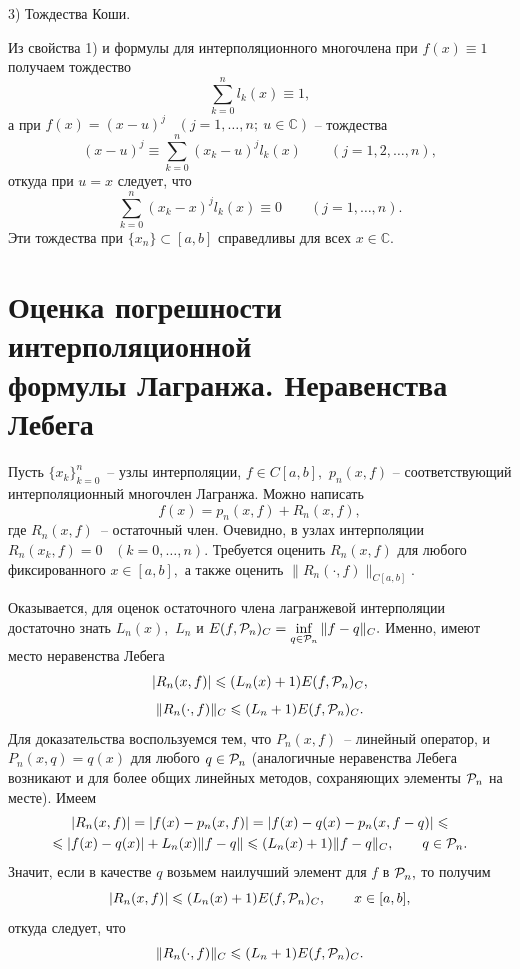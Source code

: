 3) Тождества Коши.

Из свойства 1) и формулы для интерполяционного многочлена {при $f(x)\equiv 1$}
получаем {тождество}
\[ \sum\limits_{k=0}^n l_k(x) \equiv 1, \]
{а при} $f(x)=(x-u)^j$~ $(j=1,\dots ,n;\ u\in \mathbb C)$ {-- тождества}
$$
(x-u)^j\equiv \sum\limits_{k=0}^n (x_k-u)^j l_k(x) \qquad (j=1,2,\ldots,n),
$$
{откуда при} $u=x$ следует, {что}
\begin{equation}\label{f1-1}
\sum\limits_{k=0}^n (x_k-x)^j l_k(x)\equiv 0\qquad (j=1,\ldots ,n).
\end{equation}
Эти тождества при $\{x_n\}\subset [a,b]$ справедливы для
всех $x\in \mathbb C.$

\section{Оценка погрешности интерполяционной \\ формулы
Лагранжа. Неравенства Лебега}

Пусть $\{x_k\}_{k=0}^n$~-- узлы интерполяции, $f \in C[a,b],$ $p_n(x,f)$ --
соответствующий интерполяционный многочлен Лагранжа. Можно написать
\[
  f(x)=p_n(x,f)+R_n(x,f),
\]
где $R_n(x,f)$~-- остаточный член. Очевидно, в узлах интерполяции $R_n(x_k,f)=0$~
$(k=0,\dots ,n).$ Требуется оценить $R_n(x,f)$ для любого фиксированного $x \in [a,b],$
а также оценить $\|R_n(\cdot ,f)\|_{C[a,b]}.$

Оказывается, для оценок остаточного члена лагранжевой интерполяции {достаточно} знать
$L_n(x),$ $L_n$ {и} $E(f ,\mathcal{P}_n)_C=\inf\limits_{q \in \mathcal{P}_n}\|f-q\|_{{C}}.$
Именно, имеют место неравенства Лебега
\[  |R_n(x,f)|\leqslant (L_n(x)+1)E(f ,\mathcal{P}_n)_C,             \]
\[  \|R_n(\cdot ,f)\|_{{C}} \leqslant (L_n+1)E(f ,\mathcal{P}_n)_C.             \]
Для доказательства воспользуемся тем, что $P_n(x,f)$~-- линейный оператор, и
$P_n(x,q)=q(x)$ для любого $q \in \mathcal{P}_n$ ({аналогичные неравенства} Лебега
{возникают} и {для} более {общих линейных методов, сохраняющих элементы $\mathcal{P}_n$ на месте}). Имеем
\begin{multline*}
  |R_n(x,f)|=|f(x)-p_n(x,f)|=|f(x)-q(x)-p_n(x,f-q)|\leqslant  \\
  \leqslant |f(x)-q(x)|+L_n(x)\|f-q\| \leqslant
      (L_n(x)+1)\|f-q\|_{{C}}, \qquad q \in \mathcal{P}_n.
\end{multline*}
Значит, если в качестве $q$
возьмем наилучший элемент для $f$
в $\mathcal{P}_n,$
то получим
\[  |R_n(x,f)|\leqslant (L_n(x)+1)E(f ,\mathcal{P}_n)_C,\qquad x\in [a,b],   \]
откуда следует, что
\[  \|R_n(\cdot ,f)\|_{{C}} \leqslant (L_n+1)E(f ,\mathcal{P}_n)_C.             \]

